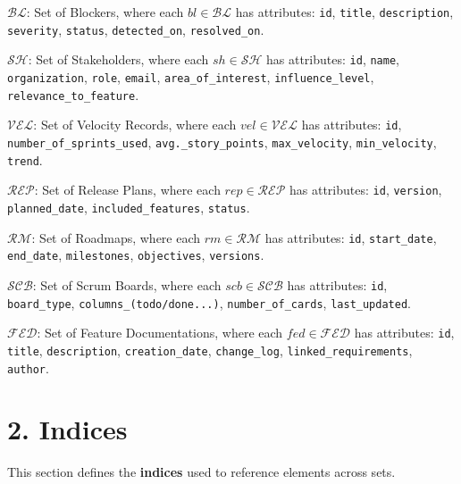 \documentclass[12pt]{article}
\begin{document}
    \item $\mathcal{BL}$: Set of Blockers, where each $bl \in \mathcal{BL}$ has attributes: \texttt{id}, \texttt{title}, \texttt{description}, \texttt{severity}, \texttt{status}, \texttt{detected\_on}, \texttt{resolved\_on}.
    \item $\mathcal{SH}$: Set of Stakeholders, where each $sh \in \mathcal{SH}$ has attributes: \texttt{id}, \texttt{name}, \texttt{organization}, \texttt{role}, \texttt{email}, \texttt{area\_of\_interest}, \texttt{influence\_level}, \texttt{relevance\_to\_feature}.
    \item $\mathcal{VEL}$: Set of Velocity Records, where each $vel \in \mathcal{VEL}$ has attributes: \texttt{id}, \texttt{number\_of\_sprints\_used}, \texttt{avg.\_story\_points}, \texttt{max\_velocity}, \texttt{min\_velocity}, \texttt{trend}.
    \item $\mathcal{REP}$: Set of Release Plans, where each $rep \in \mathcal{REP}$ has attributes: \texttt{id}, \texttt{version}, \texttt{planned\_date}, \texttt{included\_features}, \texttt{status}.
    \item $\mathcal{RM}$: Set of Roadmaps, where each $rm \in \mathcal{RM}$ has attributes: \texttt{id}, \texttt{start\_date}, \texttt{end\_date}, \texttt{milestones}, \texttt{objectives}, \texttt{versions}.
    \item $\mathcal{SCB}$: Set of Scrum Boards, where each $scb \in \mathcal{SCB}$ has attributes: \texttt{id}, \texttt{board\_type}, \texttt{columns\_(todo/done...)}, \texttt{number\_of\_cards}, \texttt{last\_updated}.
    \item $\mathcal{FED}$: Set of Feature Documentations, where each $fed \in \mathcal{FED}$ has attributes: \texttt{id}, \texttt{title}, \texttt{description}, \texttt{creation\_date}, \texttt{change\_log}, \texttt{linked\_requirements}, \texttt{author}.

\section{2. Indices}

This section defines the \textbf{indices} used to reference elements across sets.
\end{document}
